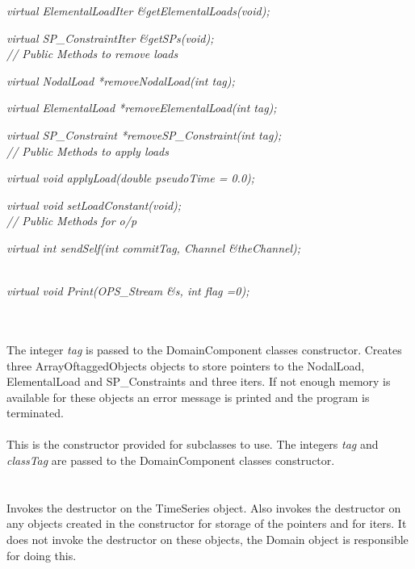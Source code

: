 {\em  virtual ElementalLoadIter \&getElementalLoads(void);}

{\em  virtual SP\_ConstraintIter \&getSPs(void);}\\ 

{\em  // Public Methods to remove loads}

{\em  virtual NodalLoad *removeNodalLoad(int tag);}

{\em  virtual ElementalLoad *removeElementalLoad(int tag);}

{\em  virtual SP\_Constraint *removeSP\_Constraint(int tag);}\\ 

{\em  // Public Methods to apply loads}

{\em  virtual void applyLoad(double pseudoTime = 0.0);}

{\em  virtual void setLoadConstant(void);}\\ 

{\em  // Public Methods for o/p}

{\em  virtual int sendSelf(int commitTag, Channel \&theChannel);}

\\
{\em  virtual void Print(OPS_Stream \&s, int flag =0);}



 \\ 
\\ 
The integer {\em tag} is passed to the DomainComponent classes
constructor. Creates three ArrayOftaggedObjects objects to store
pointers to the NodalLoad, ElementalLoad and SP\_Constraints and three
iters. If not enough memory is available for these objects an error
message is printed and the program is terminated. \\  

\\ 
This is the constructor provided for subclasses to use. The integers
{\em tag} and {\em classTag} are passed to the DomainComponent classes
constructor. \\ 

 \\
\\ 
Invokes the destructor on the TimeSeries object. Also invokes the
destructor on any objects created in the constructor for storage of
the pointers and for iters. It does not invoke the destructor on these
objects, the Domain object is responsible for doing this.\\


